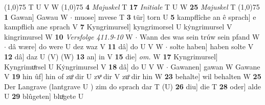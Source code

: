 \documentclass[8pt,a4paper,notitlepage]{article}
\begin{document}
\begin{table}[ht]
\begin{minipage}[t]{0.5\linewidth}
\begin{tabular}{rl}
\end{tabular}
\scriptsize
\line(1,0){75} \newline
T U V W \newline
\line(1,0){75} \newline
\textbf{4} \textit{Majuskel} T  \textbf{17} \textit{Initiale} T U W  \textbf{25} \textit{Majuskel} T  \newline
\line(1,0){75} \newline
\textbf{1} Gawan] Gawau W  $\cdot$ muose] mvese T \textbf{3} tür] torn U \textbf{5} kampflîche an ê sprach] e kampflich ane sprach V \textbf{7} Kyngrimursel] kyngrimorsel U kẏngrimursel V kingrimursel W \textbf{10} \textit{Versfolge 411.9-10} W   $\cdot$ Wann des was sein trúw sein pfand W  $\cdot$ dâ wære] do were U dez waz V \textbf{11} dâ] do U V W  $\cdot$ solte haben] haben solte V \textbf{12} dâ] daz U (V) (W) \textbf{13} an] in V \textbf{15} die] \textit{om.} W \textbf{17} Kyngrimursel] Kyngrimuͦrsel U Kẏngrimursel V \textbf{18} dâ] do U V W  $\cdot$ Gawanen] gawan W Gawane V \textbf{19} hin ûf] hin of zuͦ dir U zvͦ dir V zuͦ dir hin W \textbf{23} behalte] wil behalten W \textbf{25} Der Langrave (lantgrave U ) zim do sprach dar T (U) \textbf{26} diu] die T \textbf{28} oder] alde U \textbf{29} blûgeten] bluͦgete U \newline
\end{minipage}
\end{table}
\end{document}
